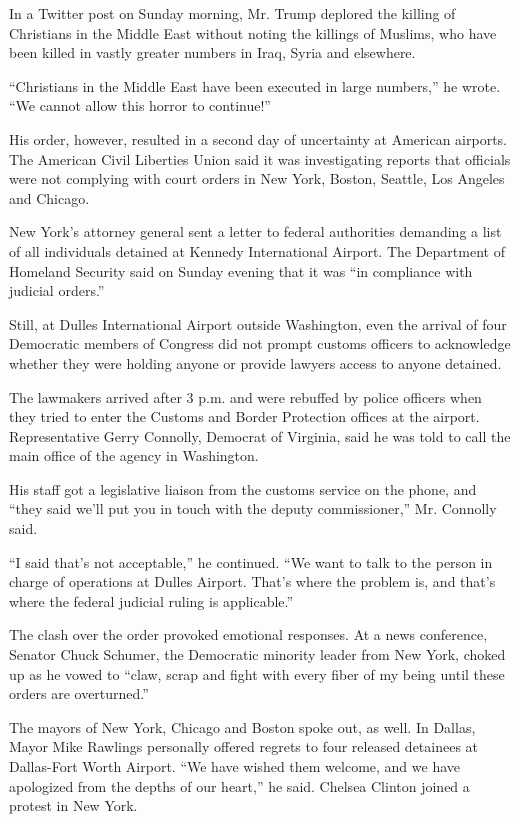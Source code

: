 In a Twitter post on Sunday morning, Mr. Trump deplored the killing of
Christians in the Middle East without noting the killings of Muslims,
who have been killed in vastly greater numbers in Iraq, Syria and
elsewhere.

``Christians in the Middle East have been executed in large numbers,''
he wrote. ``We cannot allow this horror to continue!''

His order, however, resulted in a second day of uncertainty at American
airports. The American Civil Liberties Union said it was investigating
reports that officials were not complying with court orders in New York,
Boston, Seattle, Los Angeles and Chicago.

New York's attorney general sent a letter to federal authorities
demanding a list of all individuals detained at Kennedy International
Airport. The Department of Homeland Security said on Sunday evening that
it was ``in compliance with judicial orders.''

Still, at Dulles International Airport outside Washington, even the
arrival of four Democratic members of Congress did not prompt customs
officers to acknowledge whether they were holding anyone or provide
lawyers access to anyone detained.

The lawmakers arrived after 3 p.m. and were rebuffed by police officers
when they tried to enter the Customs and Border Protection offices at
the airport. Representative Gerry Connolly, Democrat of Virginia, said
he was told to call the main office of the agency in Washington.

His staff got a legislative liaison from the customs service on the
phone, and ``they said we'll put you in touch with the deputy
commissioner,'' Mr. Connolly said.

``I said that's not acceptable,'' he continued. ``We want to talk to the
person in charge of operations at Dulles Airport. That's where the
problem is, and that's where the federal judicial ruling is
applicable.''

The clash over the order provoked emotional responses. At a news
conference, Senator Chuck Schumer, the Democratic minority leader from
New York, choked up as he vowed to ``claw, scrap and fight with every
fiber of my being until these orders are overturned.''

The mayors of New York, Chicago and Boston spoke out, as well. In
Dallas, Mayor Mike Rawlings personally offered regrets to four released
detainees at Dallas-Fort Worth Airport. ``We have wished them welcome,
and we have apologized from the depths of our heart,'' he said. Chelsea
Clinton joined a protest in New York.

